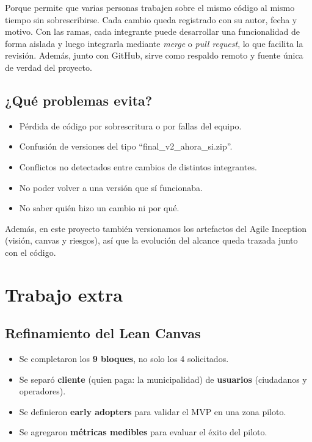 \documentclass[11pt,a4paper]{article}
\begin{document}
Porque permite que varias personas trabajen sobre el mismo código al mismo tiempo sin sobrescribirse. Cada cambio queda registrado con su autor, fecha y motivo. Con las ramas, cada integrante puede desarrollar una funcionalidad de forma aislada y luego integrarla mediante \textit{merge} o \textit{pull request}, lo que facilita la revisión. Además, junto con GitHub, sirve como respaldo remoto y fuente única de verdad del proyecto.

\subsection*{¿Qué problemas evita?}

\begin{itemize}
  \item Pérdida de código por sobrescritura o por fallas del equipo.
  \item Confusión de versiones del tipo ``final\_v2\_ahora\_si.zip''.
  \item Conflictos no detectados entre cambios de distintos integrantes.
  \item No poder volver a una versión que sí funcionaba.
  \item No saber quién hizo un cambio ni por qué.
\end{itemize}

Además, en este proyecto también versionamos los artefactos del Agile Inception (visión, canvas y riesgos), así que la evolución del alcance queda trazada junto con el código.

\section{Trabajo extra}

\subsection{Refinamiento del Lean Canvas}

\begin{itemize}
  \item Se completaron los \textbf{9 bloques}, no solo los 4 solicitados.
  \item Se separó \textbf{cliente} (quien paga: la municipalidad) de \textbf{usuarios} (ciudadanos y operadores).
  \item Se definieron \textbf{early adopters} para validar el MVP en una zona piloto.
  \item Se agregaron \textbf{métricas medibles} para evaluar el éxito del piloto.
\end{itemize}
\end{document}
